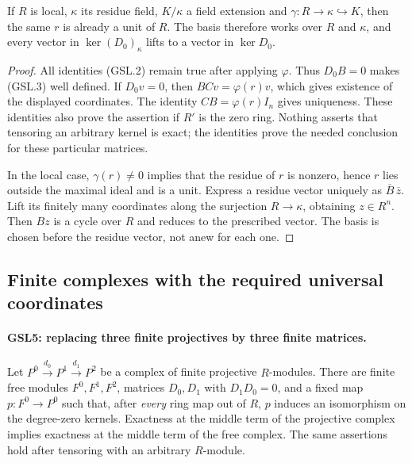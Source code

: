 \documentclass[11pt,a4paper]{article}
\numberwithin{equation}{section}
\theoremstyle{remark}\newtheorem{remark}[theorem]{Remark}
\begin{document}
If $R$ is local, $\kappa$ its residue field, $K/\kappa$ a field
extension and $\gamma:R\to\kappa\hookrightarrow K$, then the
same $r$ is already a unit of $R$.  The basis therefore works over $R$
and $\kappa$, and every vector in $\ker(D_0)_\kappa$ lifts to a
vector in $\ker D_0$.

\begin{proof}
All identities (GSL.2) remain true after applying $\varphi$.  Thus
$D_0B=0$ makes (GSL.3) well defined.  If $D_0v=0$, then
$BCv=\varphi(r)v$, which gives existence of the displayed coordinates.
The identity $CB=\varphi(r)I_n$ gives uniqueness.  These identities
also prove the assertion if $R'$ is the zero ring.  Nothing asserts
that tensoring an arbitrary kernel is exact; the identities prove the
needed conclusion for these particular matrices.

In the local case, $\gamma(r)\ne0$ implies that the residue of $r$
is nonzero, hence $r$ lies outside the maximal ideal and is a unit.
Express a residue vector uniquely as $\overline B\,\overline z$.
Lift its finitely many coordinates along the surjection
$R\to\kappa$, obtaining $z\in R^n$.  Then $Bz$ is a cycle over $R$
and reduces to the prescribed vector.  The basis is chosen before the
residue vector, not anew for each one.
\end{proof}

\subsection{Finite complexes with the required universal coordinates}

\paragraph{GSL5: replacing three finite projectives by three finite matrices.}
\label{claim:GSL5}
Let $P^0\xrightarrow{d_0}P^1\xrightarrow{d_1}P^2$ be a complex
of finite projective $R$-modules.  There are finite free modules
$F^0,F^1,F^2$, matrices $D_0,D_1$ with $D_1D_0=0$, and a fixed
map $p:F^0\to P^0$ such that, after \emph{every} ring map out of $R$,
$p$ induces an isomorphism on the degree-zero kernels.  Exactness at
the middle term of the projective complex implies exactness at the
middle term of the free complex.  The same assertions hold after
tensoring with an arbitrary $R$-module.
\end{document}
